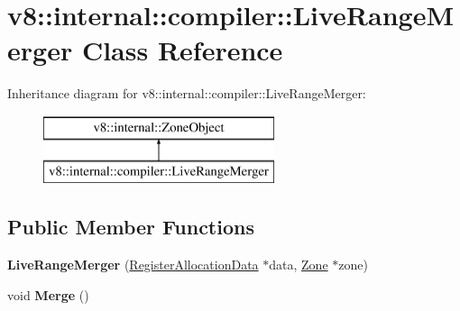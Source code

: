 \hypertarget{classv8_1_1internal_1_1compiler_1_1_live_range_merger}{}\section{v8\+:\+:internal\+:\+:compiler\+:\+:Live\+Range\+Merger Class Reference}
\label{classv8_1_1internal_1_1compiler_1_1_live_range_merger}
Inheritance diagram for v8\+:\+:internal\+:\+:compiler\+:\+:Live\+Range\+Merger\+:\begin{figure}[H]
\begin{center}
\leavevmode
\includegraphics[height=2.000000cm]{classv8_1_1internal_1_1compiler_1_1_live_range_merger}
\end{center}
\end{figure}
\subsection*{Public Member Functions}
\begin{DoxyCompactItemize}
\item 
{\bfseries Live\+Range\+Merger} (\hyperlink{classv8_1_1internal_1_1compiler_1_1_register_allocation_data}{Register\+Allocation\+Data} $\ast$data, \hyperlink{classv8_1_1internal_1_1_zone}{Zone} $\ast$zone)\hypertarget{classv8_1_1internal_1_1compiler_1_1_live_range_merger_a6f8f024ad5b819a2d19880cfdcb36627}{}\label{classv8_1_1internal_1_1compiler_1_1_live_range_merger_a6f8f024ad5b819a2d19880cfdcb36627}

\item 
void {\bfseries Merge} ()\hypertarget{classv8_1_1internal_1_1compiler_1_1_live_range_merger_a762ac8fa9295f964b5746cae25d42081}{}\label{classv8_1_1internal_1_1compiler_1_1_live_range_merger_a762ac8fa9295f964b5746cae25d42081}

\end{DoxyCompactItemize}
